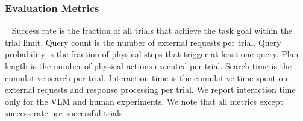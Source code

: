 \subsubsection{Evaluation Metrics}~\label{exp:metrics}
Success rate is the fraction of all trials that achieve the task goal within the trial limit. Query count is the number of external requests per trial. Query probability is the fraction of physical steps that trigger at least one query. Plan length is the number of physical actions executed per trial. Search time is the cumulative  search  per trial. Interaction time is the cumulative time spent on external requests and response processing per trial. We report interaction time only for the VLM and human experiments. We note that all metrics except success rate use successful trials .
